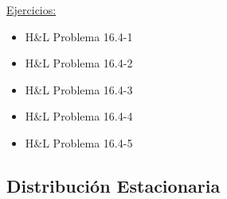 \documentclass[ 10pt, xcolor = dvipsnames]{beamer}
\begin{document}
\begin{frame}[allowframebreaks]
\frametitle{\insertsubsection}

\underline{Ejercicios:}
\begin{itemize}
\item H\&L Problema 16.4-1
\item H\&L Problema 16.4-2
\item H\&L Problema 16.4-3
\item H\&L Problema 16.4-4
\item H\&L Problema 16.4-5
\end{itemize}

\end{frame}

\subsection{Distribuci\'on Estacionaria}
\end{document}
